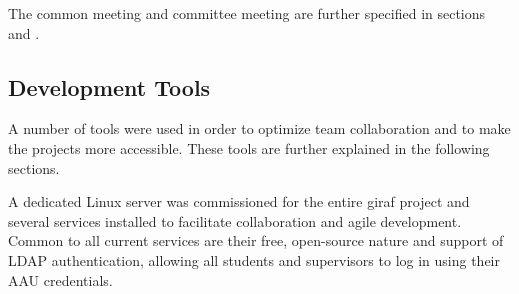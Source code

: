 The common meeting and committee meeting are further specified in sections  and .

\subsection{Development Tools}
\label{sub:devtools}
A number of tools were used in order to optimize team collaboration and to make the projects more accessible. These tools are further explained in the following sections.

A dedicated Linux server was commissioned for the entire \ac{giraf} project and several services installed to facilitate collaboration and agile development. Common to all current services are their free, open-source nature and support of LDAP authentication, allowing all students and supervisors to log in using their AAU credentials.

